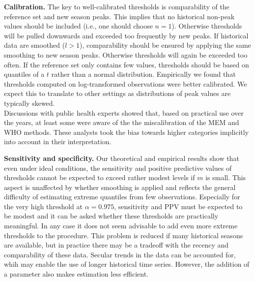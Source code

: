 \documentclass[12pt]{article}
\begin{document}
\begin{description}
\item \textbf{Calibration.} The key to well-calibrated thresholds is comparability of the reference set and new season peaks. This implies that no historical non-peak values should be included (i.e., one should choose $n = 1$). Otherwise thresholds will be pulled downwards and exceeded too frequently by new peaks. If historical data are smoothed ($l > 1$), comparability should be ensured by applying the same smoothing to new season peaks. Otherwise thresholds will again be exceeded too often. If the reference set only contains few values, thresholds should be based on quantiles of a $t$ rather than a normal distribution. Empirically we found that thresholds computed on log-transformed observations were better calibrated. We expect this to translate to other settings as distributions of peak values are typically skewed.\\
Discussions with public health experts showed that, based on practical use over the years, at least some were aware of the the miscalibration of the MEM and WHO methods. These analysts took the bias towards higher categories implicitly into account in their interpretation. %
\item \textbf{Sensitivity and specificity.} Our theoretical and empirical results show that even under ideal conditions, the sensitivity and positive predictive values of thresholds cannot be expected to exceed rather modest levels if $m$ is small. This aspect is unaffected by whether smoothing is applied and reflects the general difficulty of estimating extreme quantiles from few observations. Especially for the very high threshold at $\alpha = 0.975$, sensitivity and PPV must be expected to be modest and it can be asked whether these thresholds are practically meaningful. In any case it does not seem advisable to add even more extreme thresholds to the procedure. This problem is reduced if many historical seasons are available, but in practice there may be a tradeoff with the recency and comparability of these data. Secular trends in the data can be accounted for, whih may enable the use of longer historical time series. However, the addition of a parameter also makes estimation less efficient. %

\end{description}
\end{document}
